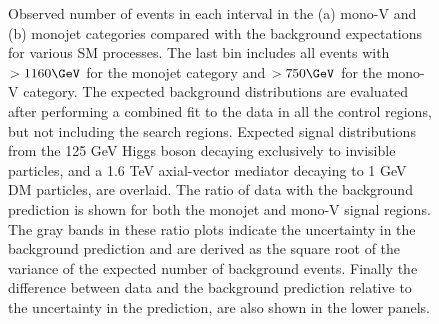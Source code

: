 \begin{figure}[hbt!]
\begin{center}
\caption{
      Observed number of events in each \ETmiss interval in the (a) mono-V and (b) monojet categories compared with the background expectations for various SM processes.
      The last bin includes all events with \ETmiss$ > 1160 \GeV$ for the monojet category and \ETm$ > 750 \GeV$ for the mono-V category.
      The expected background distributions are evaluated after performing a combined fit to the data in all the control regions, but not including the search regions.
      Expected signal distributions from the 125 GeV Higgs boson decaying exclusively to invisible particles, and a 1.6 TeV axial-vector mediator decaying to 1 GeV DM particles, are overlaid.
      The ratio of data with the background prediction is shown for both the monojet and mono-V signal regions.
      The gray bands in these ratio plots indicate the uncertainty in the background prediction and are derived as the square root of the variance of the expected number of background events.
      Finally the difference between data and the background prediction relative to the uncertainty in the prediction,
      are also shown in the lower panels.
   }
   \label{fig:monojetv} 
  \end{center}
\end{figure}


